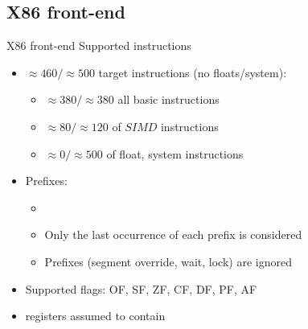 \subsection{X86 front-end}

\begin{frame}{X86 front-end}
    Supported instructions\\
    \begin{itemize}
    \item $\approx 460/\approx 500$ target instructions (no floats/system):
    \begin{itemize}
     \item $\approx 380/ \approx 380$ all basic instructions
     \item $\approx 80/ \approx 120$ of $SIMD$ instructions
     \item $\approx 0 / \approx 500$ of float, system instructions
    \end{itemize}
    \item Prefixes: 
    \begin{itemize}
    \item {\color{blue}{Operand size, address size, repetition}}
    \item Only the last occurrence of each prefix is considered
    \item Prefixes (segment override, wait, lock) are ignored
    \end{itemize}
    \item Supported flags: OF, SF, ZF, CF, DF, PF, AF
    \item {\color{red}{Segments}} registers assumed to contain {\color{red}{zero}}
    \end{itemize}
\end{frame}


